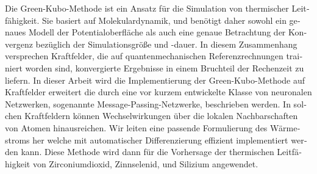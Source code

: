 \begin{otherlanguage}{german}
Die Green-Kubo-Methode ist ein Ansatz für die Simulation von thermischer Leitfähigkeit. Sie basiert auf Molekulardynamik, und benötigt daher sowohl ein genaues Modell der Potentialoberfläche als auch eine genaue Betrachtung der Konvergenz bezüglich der Simulationsgröße und -dauer. In diesem Zusammenhang versprechen Kraftfelder, die auf quantenmechanischen Referenzrechnungen trainiert worden sind, konvergierte Ergebnisse in einem Bruchteil der Rechenzeit zu liefern.
In dieser Arbeit wird die Implementierung der Green-Kubo-Methode auf Kraftfelder erweitert die durch eine vor kurzem entwickelte Klasse von neuronalen Netzwerken, sogenannte Message-Passing-Netzwerke, beschrieben werden. In solchen Kraftfeldern können Wechselwirkungen über die lokalen Nachbarschaften von Atomen hinausreichen. 
Wir leiten eine passende Formulierung des Wärmestroms her welche mit automatischer Differenzierung effizient implementiert werden kann.
Diese Methode wird dann für die Vorhersage der thermischen Leitfähigkeit von Zirconiumdioxid, Zinnselenid, und Silizium angewendet.


\end{otherlanguage}
